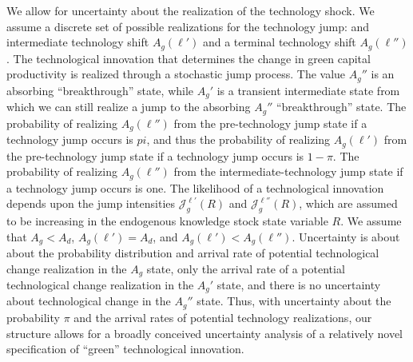 \documentclass[12pt]{article}
\begin{document}
We allow for uncertainty about the realization of the technology shock. We assume a discrete set of possible realizations for the technology jump: and intermediate technology shift $A_g(\ell')$ and a terminal technology shift $A_g(\ell'')$. The technological innovation that determines the change in green capital productivity is realized through a stochastic jump process. The value $A_g''$ is an absorbing ``breakthrough'' state, while $A_g'$ is a transient intermediate state from which we can still realize a jump to the absorbing $A_g''$ ``breakthrough'' state. The probability of realizing $A_g(\ell'')$ from the pre-technology jump state if a technology jump occurs is $pi$, and thus the probability of realizing $A_g(\ell')$ from the pre-technology jump state if a technology jump occurs is $1-\pi$. The probability of realizing $A_g(\ell'')$ from the intermediate-technology jump state if a technology jump occurs is one. The likelihood of a technological innovation depends upon the jump intensities $\mathcal{J}^{\ell'}_g(R)$ and $\mathcal{J}^{\ell''}_g(R)$, which are assumed to be increasing in the endogenous knowledge stock state variable $R$. We assume that $A_g < A_d$, $A_g(\ell') = A_d$, and $ A_g(\ell') < A_g(\ell'')$. Uncertainty is about about the probability distribution and arrival rate of potential technological change realization in the $A_g$ state, only the arrival rate of a potential technological change realization in the $A_g'$ state, and there is no uncertainty about technological change in the $A_g''$ state. Thus, with uncertainty about the probability $\pi$ and the arrival rates of potential technology realizations, our structure allows for a broadly conceived uncertainty analysis of a relatively novel specification of ``green'' technological innovation.

\end{document}
